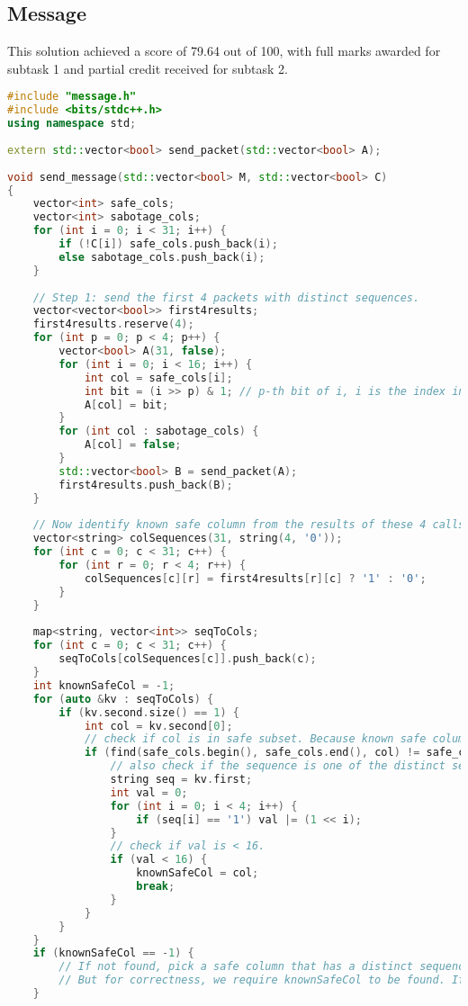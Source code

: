 \subsection{Message}
This solution achieved a score of 79.64 out of 100, with full marks awarded for subtask 1 and partial credit received for subtask 2.

\begin{lstlisting}[language=C++]
#include "message.h"
#include <bits/stdc++.h>
using namespace std;
 
extern std::vector<bool> send_packet(std::vector<bool> A);
 
void send_message(std::vector<bool> M, std::vector<bool> C)
{
    vector<int> safe_cols;
    vector<int> sabotage_cols;
    for (int i = 0; i < 31; i++) {
        if (!C[i]) safe_cols.push_back(i);
        else sabotage_cols.push_back(i);
    }
 
    // Step 1: send the first 4 packets with distinct sequences.
    vector<vector<bool>> first4results;
    first4results.reserve(4);
    for (int p = 0; p < 4; p++) {
        vector<bool> A(31, false);
        for (int i = 0; i < 16; i++) {
            int col = safe_cols[i];
            int bit = (i >> p) & 1; // p-th bit of i, i is the index in safe subset
            A[col] = bit;
        }
        for (int col : sabotage_cols) {
            A[col] = false;
        }
        std::vector<bool> B = send_packet(A);
        first4results.push_back(B);
    }
 
    // Now identify known safe column from the results of these 4 calls.
    vector<string> colSequences(31, string(4, '0'));
    for (int c = 0; c < 31; c++) {
        for (int r = 0; r < 4; r++) {
            colSequences[c][r] = first4results[r][c] ? '1' : '0';
        }
    }
 
    map<string, vector<int>> seqToCols;
    for (int c = 0; c < 31; c++) {
        seqToCols[colSequences[c]].push_back(c);
    }
    int knownSafeCol = -1;
    for (auto &kv : seqToCols) {
        if (kv.second.size() == 1) {
            int col = kv.second[0];
            // check if col is in safe subset. Because known safe column must be a safe column.
            if (find(safe_cols.begin(), safe_cols.end(), col) != safe_cols.end()) {
                // also check if the sequence is one of the distinct sequences for safe subset. The index in the safe subset is i, the sequence is 4 bits representing i.
                string seq = kv.first;
                int val = 0;
                for (int i = 0; i < 4; i++) {
                    if (seq[i] == '1') val |= (1 << i);
                }
                // check if val is < 16.
                if (val < 16) {
                    knownSafeCol = col;
                    break;
                }
            }
        }
    }
    if (knownSafeCol == -1) {
        // If not found, pick a safe column that has a distinct sequence anyway.
        // But for correctness, we require knownSafeCol to be found. If not found, our method has a problem.
    }
 

\end{lstlisting}
